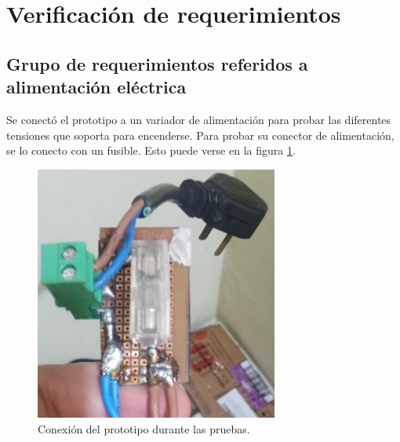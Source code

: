



\section{ Verificación de requerimientos}


\subsection{Grupo de requerimientos referidos a alimentación eléctrica}

Se conectó el prototipo a un variador de alimentación para probar las diferentes tensiones que soporta para encenderse. Para probar su conector de alimentación, se lo conecto con un fusible. Esto puede verse en la figura \ref{fig:ConectorProoto}.



\begin{figure}[!htb]
	\centering
	\includegraphics[width=80mm ,keepaspectratio]{Figures/ConectorAlim.jpeg}
	\caption{ Conexión del prototipo durante las pruebas.}
	\label{fig:ConectorProoto}
\end{figure}

